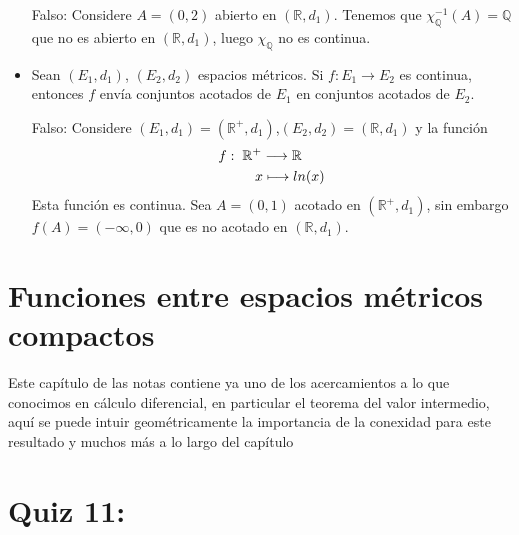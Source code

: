 \begin{itemize}[label={✎},leftmargin=*]
Falso: Considere $A=(0,2)$ abierto en $(\mathbb{R},d_1)$. Tenemos que $\chi_{\mathbb{Q}}^{-1}(A)=\mathbb{Q}$ que no es abierto en $(\mathbb{R},d_1)$, luego $\chi_{\mathbb{Q}}$ no es continua.

\item Sean $(E_1,d_1)$, $(E_2,d_2)$ espacios métricos. Si $f: E_1 \longrightarrow E_2$ es continua, entonces $f$ envía conjuntos acotados de $E_1$ en conjuntos acotados de $E_2$.

Falso: Considere $(E_1,d_1)=(\mathbb{R}^+,d_1)$,$(E_2,d_2)=(\mathbb{R},d_1)$ y la función
    \begin{align*}
        f: \hspace{2mm} &\mathbb{R}^+ \longrightarrow \mathbb{R}\\
        &\hspace*{0.32cm}x \longmapsto ln(x)
    \end{align*}
Esta función es continua. Sea $A=(0,1)$ acotado en $(\mathbb{R}^+,d_1)$, sin embargo $f(A)=(-\infty,0)$ que es no acotado en $(\mathbb{R},d_1)$.

\end{itemize}

\section{Funciones entre espacios métricos compactos}

Este capítulo de las notas contiene ya uno de los acercamientos a lo que conocimos en cálculo diferencial, en particular el teorema del valor intermedio, aquí se puede intuir geométricamente la importancia de  la conexidad para este resultado y muchos más a lo largo del capítulo

\section{Quiz 11:}

